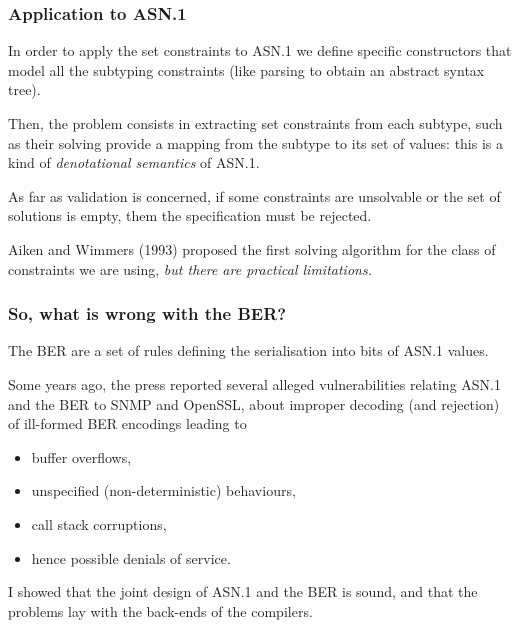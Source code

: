 \documentclass[compress,dvips,xcolor={dvipsnames},t]{beamer}
\newcommand\ASN{\textsf{ASN.1}\xspace}
\begin{document}
\begin{frame}
\frametitle{Application to \ASN}

In order to apply the set constraints to \ASN we define specific
constructors that model all the subtyping constraints (like parsing to
obtain an abstract syntax tree).

\medskip

Then, the problem consists in extracting set constraints from each
subtype, such as their solving provide a mapping from the subtype to
its set of values: this is a kind of \emph{denotational semantics} of
\ASN.

\medskip

As far as validation is concerned, if some constraints are unsolvable
or the set of solutions is empty, them the specification must be
rejected.

\medskip

Aiken and Wimmers (1993) proposed the first solving algorithm for the
class of constraints we are using, \emph{but there are practical
  limitations.}

\end{frame}


\begin{frame}
\frametitle{So, what is wrong with the BER?}

The BER are a set of rules defining the serialisation into bits of
\ASN values.

\medskip

Some years ago, the press reported several alleged vulnerabilities
relating \ASN and the BER to SNMP and OpenSSL, about improper decoding
(and rejection) of ill-formed BER encodings leading to
\begin{itemize}

  \item buffer overflows,

  \item unspecified (non-deterministic) behaviours,

  \item call stack corruptions,

  \item hence possible denials of service.

\end{itemize}

I showed that the joint design of \ASN and the BER is sound, and that
the problems lay with the back-ends of the compilers.

\end{frame}
\end{document}
